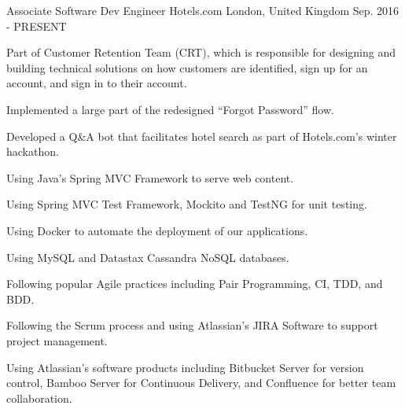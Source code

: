 

\begin{cventries}

  \cventry
    {Associate Software Dev Engineer} %
    {Hotels.com} %
    {London, United Kingdom} %
    {Sep. 2016 - PRESENT} %
    {
      \begin{cvitems} %
        \item {Part of Customer Retention Team (CRT), which is responsible for designing and building technical solutions on how customers are identified, sign up for an account, and sign in to their account.}
        \item {Implemented a large part of the redesigned ``Forgot Password'' flow.}
        \item {Developed a Q\&A bot that facilitates hotel search as part of Hotels.com's winter hackathon.}
        \item {Using Java's Spring MVC Framework to serve web content.}
        \item {Using Spring MVC Test Framework, Mockito and TestNG for unit testing.}
        \item {Using Docker to automate the deployment of our applications.}
       \item {Using MySQL and Datastax Cassandra NoSQL databases.}
        \item {Following popular Agile practices including Pair Programming, CI, TDD, and BDD.}
        \item {Following the Scrum process and using Atlassian's JIRA Software to support project management.}
        \item {Using Atlassian's software products including Bitbucket Server for version control, Bamboo Server for Continuous Delivery, and Confluence for better team collaboration.}
      \end{cvitems}
    }

\end{cventries}

